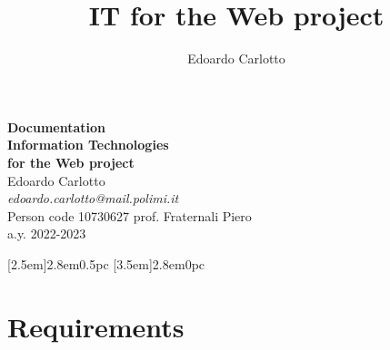 \documentclass[12pt, a4paper, renqo, final]{amsart}
\let\stdsection\section
\renewcommand{\section}{\newpage\stdsection}
\begin{document}
	\title{IT for the Web project}
	\author{Edoardo Carlotto}
	
	\pagestyle{fancy}
	
	\begin{titlepage}
		\begin{center}
			\vspace*{4cm}
			\LARGE\textbf{Documentation} \\
			\Huge\textbf{Information Technologies} \\
			\Huge\textbf{for the Web project} \\
 			\vspace{4cm}
			\LARGE Edoardo Carlotto \\
			\vspace{0.5cm}
			\large \textit{edoardo.carlotto@mail.polimi.it} \\
			Person code 10730627
			\vfill
			prof. Fraternali Piero \\
			a.y. 2022-2023\\
			\vspace*{6cm}
		\end{center}
	\end{titlepage}
	
	\contentsmargin{1.5em}
	[2.5em]{}{2.8em}{0.5pc}
	[3.5em]{}{2.8em}{0pc}
	\tableofcontents
	
	\section{Requirements}
	
\end{document}
